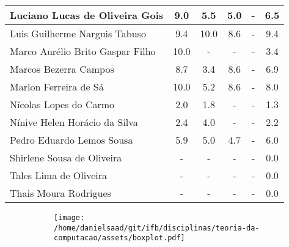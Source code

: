 \documentclass{article}
\begin{document}
\begin{longtable}{|l|c|c|c|c|c|}
Luciano Lucas de Oliveira Gois & 9.0 & 5.5 & 5.0 & - & 6.5\\\hline
Luis Guilherme Narguis Tabuso & 9.4 & 10.0 & 8.6 & - & 9.4\\\hline
Marco Aurélio Brito Gaspar Filho & 10.0 & - & - & - & 3.4\\\hline
Marcos Bezerra Campos & 8.7 & 3.4 & 8.6 & - & 6.9\\\hline
Marlon Ferreira de Sá & 10.0 & 5.2 & 8.6 & - & 8.0\\\hline
Nícolas Lopes do Carmo & 2.0 & 1.8 & - & - & 1.3\\\hline
Nínive Helen Horácio da Silva & 2.4 & 4.0 & - & - & 2.2\\\hline
Pedro Eduardo Lemos Sousa & 5.9 & 5.0 & 4.7 & - & 6.0\\\hline
Shirlene Sousa de Oliveira & - & - & - & - & 0.0\\\hline
Tales Lima de Oliveira & - & - & - & - & 0.0\\\hline
Thais Moura Rodrigues & - & - & - & - & 0.0\\\hline
\end{longtable}
\begin{figure}[h!]
\centering\begin{subfigure}
        \centering
        \texttt{[image: /home/danielsaad/git/ifb/disciplinas/teoria-da-computacao/assets/boxplot.pdf]}
    \end{subfigure}\end{figure}
\end{document}
